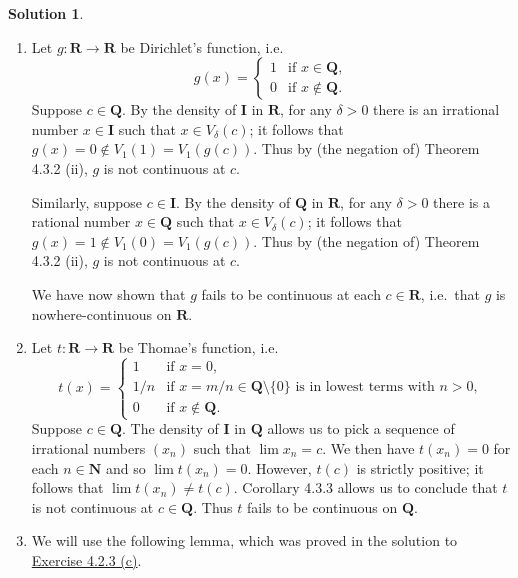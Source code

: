 \documentclass[12pt]{article}
\theoremstyle{definition}
\theoremstyle{exercise}
\theoremstyle{solution}
\newtheorem*{solution}{Solution}
\newcommand{\N}{\mathbf{N}}
\newcommand{\Q}{\mathbf{Q}}
\newcommand{\I}{\mathbf{I}}
\newcommand{\R}{\mathbf{R}}
\begin{document}
\begin{solution}
    \begin{enumerate}
        \item Let \( g : \R \to \R \) be Dirichlet's function, i.e.\
        \[
            g(x) = \begin{cases}
                1 & \text{if } x \in \Q, \\
                0 & \text{if } x \not\in \Q.
            \end{cases}
        \]
        Suppose \( c \in \Q \). By the density of \( \I \) in \( \R \), for any \( \delta > 0 \) there is an irrational number \( x \in \I \) such that \( x \in V_{\delta}(c) \); it follows that \( g(x) = 0 \not\in V_1(1) = V_1(g(c)) \). Thus by (the negation of) Theorem 4.3.2 (ii), \( g \) is not continuous at \( c \).

        Similarly, suppose \( c \in \I \). By the density of \( \Q \) in \( \R \), for any \( \delta > 0 \) there is a rational number \( x \in \Q \) such that \( x \in V_{\delta}(c) \); it follows that \( g(x) = 1 \not\in V_1(0) = V_1(g(c)) \). Thus by (the negation of) Theorem 4.3.2 (ii), \( g \) is not continuous at \( c \).

        We have now shown that \( g \) fails to be continuous at each \( c \in \R \), i.e.\ that \( g \) is nowhere-continuous on \( \R \).

        \item Let \( t : \R \to \R \) be Thomae's function, i.e.\
        \[
            t(x) = \begin{cases}
                1 & \text{if } x = 0, \\
                1/n & \text{if } x = m/n \in \Q \setminus \{ 0 \} \text{ is in lowest terms with } n > 0, \\
                0 & \text{if } x \not\in \Q.
            \end{cases}
        \]
        Suppose \( c \in \Q \). The density of \( \I \) in \( \Q \) allows us to pick a sequence of irrational numbers \( (x_n) \) such that \( \lim x_n = c \). We then have \( t(x_n) = 0 \) for each \( n \in \N \) and so \( \lim t(x_n) = 0 \). However, \( t(c) \) is strictly positive; it follows that \( \lim t(x_n) \neq t(c) \). Corollary 4.3.3 allows us to conclude that \( t \) is not continuous at \( c \in \Q \). Thus \( t \) fails to be continuous on \( \Q \).

        \item We will use the following lemma, which was proved in the solution to \href{https://lew98.github.io/Mathematics/UA_Section_4_2_Exercises.pdf}{Exercise 4.2.3 (c)}.


\end{enumerate}
\end{solution}
\end{document}
